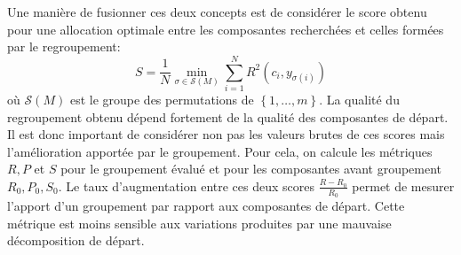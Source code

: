 \documentclass{gretsi}
\newcommand{\set}[1]{\left \{ 1, \dots, #1 \right \}}
\begin{document}
    Une manière de fusionner ces deux concepts est de considérer le score obtenu pour une allocation optimale entre les composantes recherchées et celles formées par le regroupement:
    \begin{equation}
        S =  \frac{1}{N} \min_{\sigma \in \mathcal S(M)} \sum_{i=1}^N R^2(c_i, y_{\sigma(i)})
    \end{equation}
    où $\mathcal S(M)$ est le groupe des permutations de $\set{m}$.
    La qualité du regroupement obtenu dépend fortement de la qualité des composantes de départ.
    Il est donc important de considérer non pas les valeurs brutes de ces scores mais l'amélioration apportée par le groupement.
    Pour cela, on calcule les métriques $R, P$ et $S$ pour le groupement évalué et pour les composantes avant groupement $R_0, P_0, S_0$.
    Le taux d'augmentation entre ces deux scores $\frac{R-R_0}{R_0}$ permet de mesurer l'apport d'un groupement par rapport aux composantes de départ.
    Cette métrique est moins sensible aux variations produites par une mauvaise décomposition de départ.
    

% 
    


    
\end{document}
